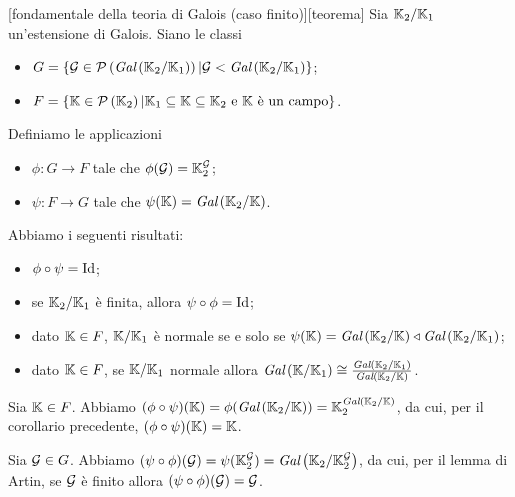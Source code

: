 \begin{Theorem}
	[fondamentale della teoria di Galois (caso finito)][teorema] Sia $\mathbb{K}_2/\mathbb{K}_1$ un'estensione di Galois. Siano le classi
	\begin{itemize}
		\item $G = \lbrace \mathcal{G} \in \mathcal{P} \left (\textit{Gal} \left ( \mathbb{K}_2/\mathbb{K}_1 \right ) \right ) | \mathcal{G} < \textit{Gal} \left ( \mathbb{K}_2/\mathbb{K}_1 \right ) \rbrace$;
		\item $F = \lbrace \mathbb{K} \in \mathcal{P} \left (\mathbb{K}_2 \right ) | \mathbb{K}_1 \subseteq \mathbb{K} \subseteq \mathbb{K}_2\text{ e $\mathbb{K}$ \`e un campo} \rbrace$.
	\end{itemize}
	Definiamo le applicazioni
	\begin{itemize}
		\item $\phi: G \rightarrow F$ tale che $\phi(\mathcal{G}) = \mathbb{K}_2^{\mathcal{G}}$;
		\item $\psi: F \rightarrow G$ tale che $\psi(\mathbb{K}) = \textit{Gal} \left ( \mathbb{K}_2/\mathbb{K} \right )$.
	\end{itemize}
	Abbiamo i seguenti risultati:
	\begin{itemize}
		\item $\phi \circ \psi = \Identity$;
		\item se $\mathbb{K}_2/\mathbb{K}_1$ \`e finita, allora $\psi \circ \phi = \Identity$;
		\item dato $\mathbb{K} \in F$, $\mathbb{K}/\mathbb{K}_1$ \`e normale se e solo se $\psi(\mathbb{K}) = \textit{Gal} \left ( \mathbb{K}_2/\mathbb{K} \right ) \triangleleft \textit{Gal} \left ( \mathbb{K}_2/\mathbb{K}_1 \right )$;
		\item dato $\mathbb{K} \in F$, se $\mathbb{K}/\mathbb{K}_1$ normale allora $\textit{Gal} \left ( \mathbb{K}/\mathbb{K}_1 \right ) \cong \frac{\textit{Gal} \left ( \mathbb{K}_2/\mathbb{K}_1 \right )}{\textit{Gal} \left ( \mathbb{K}_2/\mathbb{K} \right )}$.
	\end{itemize}
\end{Theorem}
\Proof Sia $\mathbb{K} \in F$. Abbiamo $(\phi \circ \psi)(\mathbb{K}) = \phi(\textit{Gal} \left ( \mathbb{K}_2/\mathbb{K} \right )) = \mathbb{K}_2^{\textit{Gal} \left ( \mathbb{K}_2/\mathbb{K} \right )}$, da cui, per il corollario precedente, $(\phi \circ \psi)(\mathbb{K}) = \mathbb{K}$.
\par Sia $\mathcal{G} \in G$. Abbiamo $(\psi \circ \phi)(\mathcal{G}) = \psi(\mathbb{K}_2^{\mathcal{G}}) = \textit{Gal} \left ( \mathbb{K}_2/\mathbb{K}_2^{\mathcal{G}} \right )$, da cui, per il lemma di Artin, se $\mathcal{G}$ \`e finito allora $(\psi \circ \phi)(\mathcal{G}) = \mathcal{G}$.
